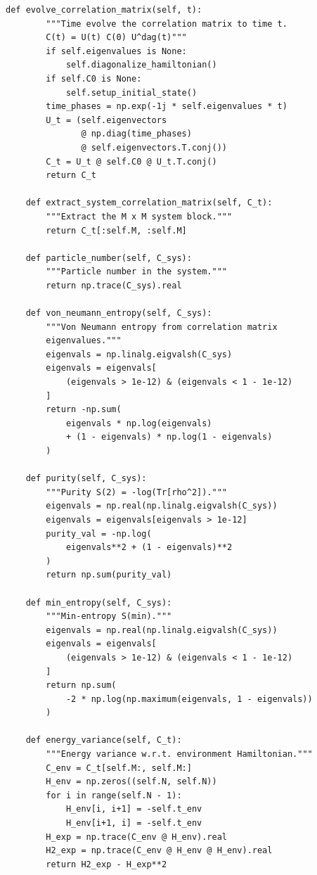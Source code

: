 \documentclass[12pt,oneside,openright]{report}
\theoremstyle{definition}
\theoremstyle{plain}
\theoremstyle{remark}
\begin{document}
\begin{lstlisting}[caption={Core simulation class for the fermionic Page curve model.}]
    def evolve_correlation_matrix(self, t):
        """Time evolve the correlation matrix to time t.
        C(t) = U(t) C(0) U^dag(t)"""
        if self.eigenvalues is None:
            self.diagonalize_hamiltonian()
        if self.C0 is None:
            self.setup_initial_state()
        time_phases = np.exp(-1j * self.eigenvalues * t)
        U_t = (self.eigenvectors
               @ np.diag(time_phases)
               @ self.eigenvectors.T.conj())
        C_t = U_t @ self.C0 @ U_t.T.conj()
        return C_t

    def extract_system_correlation_matrix(self, C_t):
        """Extract the M x M system block."""
        return C_t[:self.M, :self.M]

    def particle_number(self, C_sys):
        """Particle number in the system."""
        return np.trace(C_sys).real

    def von_neumann_entropy(self, C_sys):
        """Von Neumann entropy from correlation matrix
        eigenvalues."""
        eigenvals = np.linalg.eigvalsh(C_sys)
        eigenvals = eigenvals[
            (eigenvals > 1e-12) & (eigenvals < 1 - 1e-12)
        ]
        return -np.sum(
            eigenvals * np.log(eigenvals)
            + (1 - eigenvals) * np.log(1 - eigenvals)
        )

    def purity(self, C_sys):
        """Purity S(2) = -log(Tr[rho^2])."""
        eigenvals = np.real(np.linalg.eigvalsh(C_sys))
        eigenvals = eigenvals[eigenvals > 1e-12]
        purity_val = -np.log(
            eigenvals**2 + (1 - eigenvals)**2
        )
        return np.sum(purity_val)

    def min_entropy(self, C_sys):
        """Min-entropy S(min)."""
        eigenvals = np.real(np.linalg.eigvalsh(C_sys))
        eigenvals = eigenvals[
            (eigenvals > 1e-12) & (eigenvals < 1 - 1e-12)
        ]
        return np.sum(
            -2 * np.log(np.maximum(eigenvals, 1 - eigenvals))
        )

    def energy_variance(self, C_t):
        """Energy variance w.r.t. environment Hamiltonian."""
        C_env = C_t[self.M:, self.M:]
        H_env = np.zeros((self.N, self.N))
        for i in range(self.N - 1):
            H_env[i, i+1] = -self.t_env
            H_env[i+1, i] = -self.t_env
        H_exp = np.trace(C_env @ H_env).real
        H2_exp = np.trace(C_env @ H_env @ H_env).real
        return H2_exp - H_exp**2


\end{lstlisting}
\end{document}
